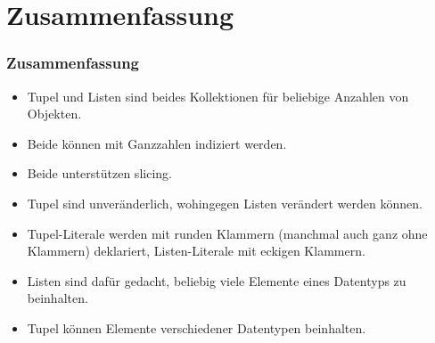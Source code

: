 \documentclass[aspectratio=169,mathserif,notheorems]{beamer}%
\begin{document}
\section{Zusammenfassung}%
%
\begin{frame}%
\frametitle{Zusammenfassung}%
\begin{itemize}%
\item Tupel und Listen sind beides Kollektionen für beliebige Anzahlen von Objekten.%
%
\item<2-> Beide können mit Ganzzahlen indiziert werden.%
%
\item<3-> Beide unterstützen slicing.%
%
\item<4-> Tupel sind unveränderlich, wohingegen Listen verändert werden können.%
%
\item<5-> Tupel-Literale werden mit runden Klammern (manchmal auch ganz ohne Klammern) deklariert, Listen-Literale mit eckigen Klammern.%
%
\item<6-> Listen sind dafür gedacht, beliebig viele Elemente eines Datentyps zu beinhalten.%
%
\item<7-> Tupel können Elemente verschiedener Datentypen beinhalten.%
%
\end{itemize}%
\end{frame}%
%
\endPresentation%
\end{document}
